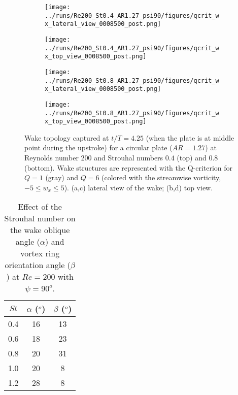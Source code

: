 \begin{figure}
  \centering
  \begin{subfigure}[]{0.45\textwidth}
    \centering
    \texttt{[image: ../runs/Re200\_St0.4\_AR1.27\_psi90/figures/qcrit\_wx\_lateral\_view\_0008500\_post.png]}
    \caption{}
  \end{subfigure}
  \hfill
  \begin{subfigure}[]{0.45\textwidth}
    \centering
    \texttt{[image: ../runs/Re200\_St0.4\_AR1.27\_psi90/figures/qcrit\_wx\_top\_view\_0008500\_post.png]}
    \caption{}
  \end{subfigure}
  \vspace{1cm}
  \begin{subfigure}[]{0.45\textwidth}
    \centering
    \texttt{[image: ../runs/Re200\_St0.8\_AR1.27\_psi90/figures/qcrit\_wx\_lateral\_view\_0008500\_post.png]}
    \caption{}
  \end{subfigure}
  \hfill
  \begin{subfigure}[]{0.45\textwidth}
    \centering
    \texttt{[image: ../runs/Re200\_St0.8\_AR1.27\_psi90/figures/qcrit\_wx\_top\_view\_0008500\_post.png]}
    \caption{}
  \end{subfigure}
  \caption{Wake topology captured at $t / T = 4.25$ (when the plate is at middle point during the upstroke) for a circular plate ($AR = 1.27$) at Reynolds number $200$ and Strouhal numbers $0.4$ (top) and $0.8$ (bottom). Wake structures are represented with the Q-criterion for $Q = 1$ (gray) and $Q = 6$ (colored with the streamwise vorticity, $-5 \leq w_x \leq 5$). (a,c) lateral view of the wake; (b,d) top view.}
  \label{fig:strouhal_wake_topology}
\end{figure}

\begin{table}
  \centering
  \begin{tabular}{ccc}
    \hline\hline
    $St$ & $\alpha$ ($^o$) & $\beta$ ($^o$) \\
    \hline
    0.4 & 16 & 13 \\
    0.6 & 18 & 23 \\
    0.8 & 20 & 31 \\
    1.0 & 20 & 8 \\
    1.2 & 28 & 8 \\
    \hline\hline
  \end{tabular}
  \caption{Effect of the Strouhal number on the wake oblique angle ($\alpha$) and vortex ring orientation angle ($\beta$) at $Re = 200$ with $\psi = 90^o$.}
  \label{tab:strouhal_angles}
\end{table}

